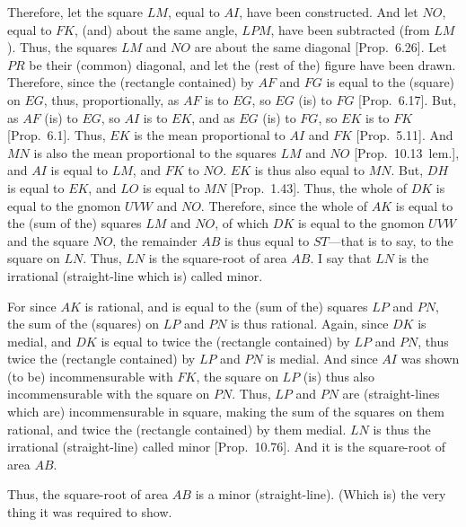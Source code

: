 \begin{Parallel}{}{}
{Therefore, let the square $LM$, equal  to $AI$, have been constructed. And let $NO$, equal to $FK$, (and) about the same angle, $LPM$,  have been subtracted (from $LM$). Thus, the squares $LM$ and $NO$ are about the
same diagonal [Prop.~6.26]. Let $PR$ be their (common) diagonal, and let the (rest of the) figure have been drawn. Therefore, since
the (rectangle contained) by $AF$ and $FG$ is equal to the (square) on $EG$, thus, proportionally, as $AF$ is to $EG$, so $EG$ (is) to $FG$
[Prop.~6.17]. 
But, as $AF$ (is) to $EG$, so
$AI$ is to $EK$, and as $EG$ (is) to $FG$, so $EK$ is to $FK$ [Prop.~6.1]. Thus, $EK$ is the mean proportional to
$AI$ and $FK$ [Prop.~5.11]. And $MN$ is also the mean proportional to the squares $LM$
and $NO$ [Prop.~10.13~lem.], and $AI$ is equal to $LM$, and $FK$ to $NO$. $EK$ is thus also equal to $MN$. But, $DH$ is equal to $EK$, and $LO$ is equal to $MN$ [Prop.~1.43]. 
Thus, the whole of $DK$ is equal to the gnomon $UVW$ and $NO$.
Therefore, since the whole of $AK$ is equal to the (sum of the) squares $LM$ and
$NO$, of which $DK$ is equal to the gnomon $UVW$ and the square
$NO$, the remainder $AB$ is thus equal to $ST$---that is to say, to the
square on $LN$. Thus, $LN$ is the square-root of area $AB$. I say
that $LN$ is the irrational (straight-line which is) called minor.

For since $AK$ is rational, and is equal to the (sum of the) squares $LP$ and $PN$,
the sum of the (squares) on $LP$ and $PN$ is thus rational. Again, since
$DK$ is medial, and $DK$ is equal to twice the (rectangle contained)
by $LP$ and $PN$, thus twice the (rectangle contained) by $LP$
and $PN$ is medial. And since $AI$ was shown (to be) incommensurable
with $FK$, the square on $LP$ (is) thus also incommensurable with
the square on $PN$. Thus, $LP$ and $PN$ are (straight-lines which are) incommensurable in square,
making the sum of the squares on them rational, and twice the (rectangle
contained) by them medial. $LN$ is thus the irrational (straight-line)
called minor [Prop.~10.76]. And it is
the square-root of area $AB$.

Thus, the square-root of area $AB$ is a minor (straight-line). (Which is)
the very thing it was required to show.}
\end{Parallel}

